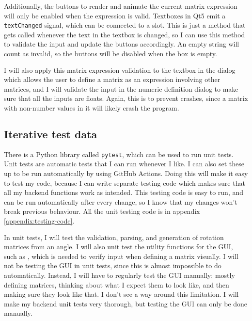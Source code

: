\documentclass[../main.tex]{subfiles}
\begin{document}
Additionally, the buttons to render and animate the current matrix expression will only be enabled when the expression is valid. Textboxes in Qt5 emit a \texttt{textChanged} signal, which can be connected to a slot. This is just a method that gets called whenever the text in the textbox is changed, so I can use this method to validate the input and update the buttons accordingly. An empty string will count as invalid, so the buttons will be disabled when the box is empty.

I will also apply this matrix expression validation to the textbox in the dialog which allows the user to define a matrix as an expression involving other matrices, and I will validate the input in the numeric definition dialog to make sure that all the inputs are floats. Again, this is to prevent crashes, since a matrix with non-number values in it will likely crash the program.

\subsection{Iterative test data\label{design:iterative-test-data}}

There is a Python library called \texttt{pytest}, which can be used to run unit tests\cite{pytest-docs}. Unit tests are automatic tests that I can run whenever I like\cite{wikipedia-unit-testing}. I can also set these up to be run automatically by using GitHub Actions\cite{github-actions-docs}. Doing this will make it easy to test my code, because I can write separate testing code which makes sure that all my backend functions work as intended. This testing code is easy to run, and can be run automatically after every change, so I know that my changes won't break previous behaviour. All the unit testing code is in appendix \ref{appendix:testing-code}.

In unit tests, I will test the validation, parsing, and generation of rotation matrices from an angle. I will also unit test the utility functions for the GUI, such as , which is needed to verify input when defining a matrix visually. I will not be testing the GUI in unit tests, since this is almost impossible to do automatically. Instead, I will have to regularly test the GUI manually; mostly defining matrices, thinking about what I expect them to look like, and then making sure they look like that. I don't see a way around this limitation. I will make my backend unit tests very thorough, but testing the GUI can only be done manually.
\end{document}
